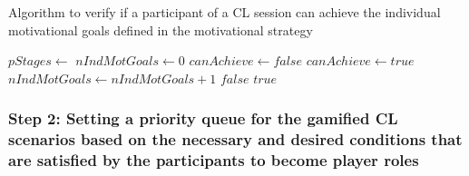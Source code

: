 \begin{algoritmo}
\caption{Algorithm to verify if a participant  of a CL session  can achieve the individual motivational goals defined in the motivational strategy }
\label{algorithm:can-achieve-ind-mot-goals-of}
\begin{scriptsize}
\begin{algorithmic}[1]
  \State $pStages \gets$ 
    \State $nIndMotGoals \gets 0$
      \State $canAchieve \gets false$
               $canAchieve \gets true$
              \EndIf
            \EndFor
          \EndFor
        \EndFor
      \EndFor
       $nIndMotGoals \gets nIndMotGoals + 1$
      \EndIf
    \EndFor
     \Return $false$
    \EndIf
  \EndIf
  \State \Return $true$
\EndFunction
\end{algorithmic}
\end{scriptsize}
\end{algoritmo}

\subsubsection*{Step 2: Setting a priority queue for the gamified CL scenarios based on the necessary and desired conditions that are satisfied by the participants to become player roles}

